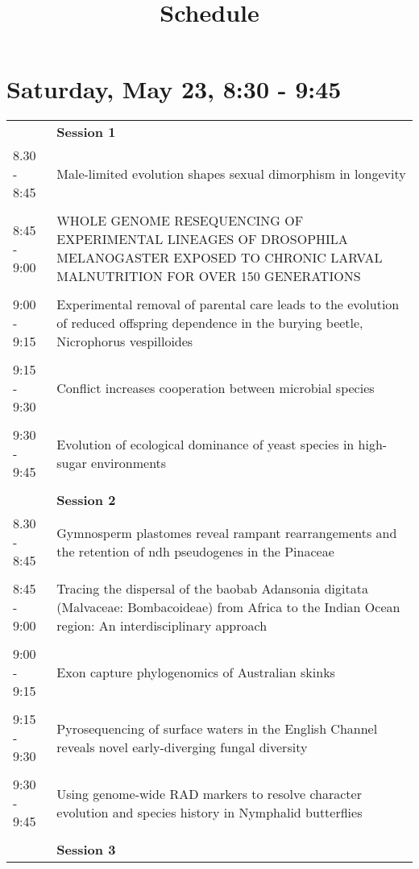 \documentclass{article}
\title{Schedule}
\date{}
\begin{document}
\maketitle{}

\section{Saturday, May 23, 8:30 - 9:45}
\begin{longtabu} to \textwidth {lX}
 & \textbf{Session 1} \\ 

8.30 - 8:45 & Male-limited evolution shapes sexual dimorphism in longevity \\ 
 &  \\ 
8:45 - 9:00 & WHOLE GENOME RESEQUENCING OF EXPERIMENTAL LINEAGES OF DROSOPHILA MELANOGASTER EXPOSED TO CHRONIC LARVAL MALNUTRITION FOR OVER 150 GENERATIONS \\ 
 &  \\ 
9:00 - 9:15 & Experimental removal of parental care leads to the evolution of reduced offspring dependence in the burying beetle, Nicrophorus vespilloides \\ 
 &  \\ 
9:15 - 9:30 & Conflict increases cooperation between microbial species \\ 
 &  \\ 
9:30 - 9:45 & Evolution of ecological dominance of yeast species in high-sugar environments \\ 
 &  \\ 
 & \textbf{Session 2} \\ 

8.30 - 8:45 & Gymnosperm plastomes reveal rampant rearrangements and the retention of ndh pseudogenes in the Pinaceae \\ 
 &  \\ 
8:45 - 9:00 & Tracing the dispersal of the baobab Adansonia digitata (Malvaceae: Bombacoideae) from Africa to the Indian Ocean region: An interdisciplinary approach \\ 
 &  \\ 
9:00 - 9:15 & Exon capture phylogenomics of Australian skinks \\ 
 &  \\ 
9:15 - 9:30 & Pyrosequencing of surface waters in the English Channel reveals novel early-diverging fungal diversity \\ 
 &  \\ 
9:30 - 9:45 & Using genome-wide RAD markers to resolve character evolution and species history in Nymphalid butterflies \\ 
 &  \\ 
 & \textbf{Session 3} \\ 


\end{longtabu}
\end{document}
